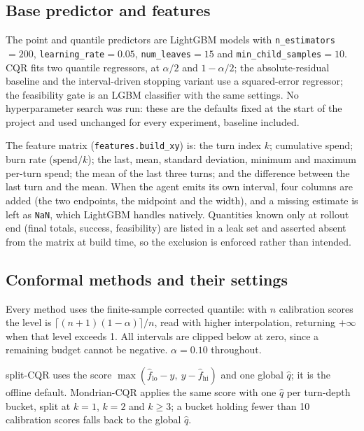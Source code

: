 \documentclass{article}
\begin{document}
\subsection{Base predictor and features}

The point and quantile predictors are LightGBM models \cite{ke2017lightgbm} with
\texttt{n\_estimators}${=}200$, \texttt{learning\_rate}${=}0.05$,
\texttt{num\_leaves}${=}15$ and \texttt{min\_child\_samples}${=}10$. CQR fits two
quantile regressors, at $\alpha/2$ and $1{-}\alpha/2$; the absolute-residual baseline
and the interval-driven stopping variant use a squared-error regressor; the feasibility
gate is an LGBM classifier with the same settings. No hyperparameter search was run:
these are the defaults fixed at the start of the project and used unchanged for every
experiment, baseline included.

The feature matrix (\texttt{features.build\_xy}) is: the turn index $k$; cumulative
spend; burn rate ($\mathrm{spend}/k$); the last, mean, standard deviation, minimum and
maximum per-turn spend; the mean of the last three turns; and the difference between
the last turn and the mean. When the agent emits its own interval, four columns are
added (the two endpoints, the midpoint and the width), and a missing estimate is left
as \texttt{NaN}, which LightGBM handles natively. Quantities known only at rollout end
(final totals, success, feasibility) are listed in a leak set and asserted absent from
the matrix at build time, so the exclusion is enforced rather than intended.

\subsection{Conformal methods and their settings}

Every method uses the finite-sample corrected quantile: with $n$ calibration scores the
level is $\lceil (n+1)(1{-}\alpha) \rceil / n$, read with higher interpolation,
returning $+\infty$ when that level exceeds 1. All intervals are clipped below at zero,
since a remaining budget cannot be negative. $\alpha{=}0.10$ throughout.

split-CQR uses the score $\max(\hat f_{\mathrm{lo}}-y,\ y-\hat f_{\mathrm{hi}})$ and
one global $\hat q$; it is the offline default. Mondrian-CQR applies the same score
with one $\hat q$ per turn-depth bucket, split at $k{=}1$, $k{=}2$ and $k{\geq}3$; a
bucket holding fewer than 10 calibration scores falls back to the global $\hat q$.
\end{document}
